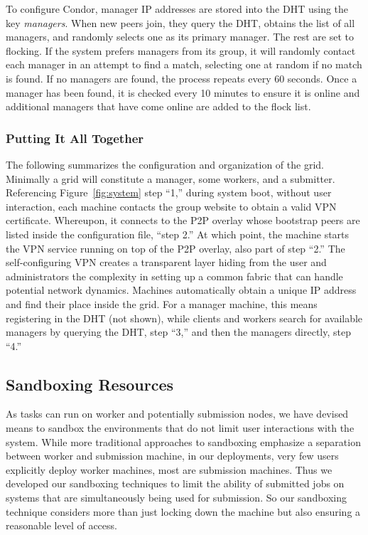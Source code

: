 \documentclass[conference]{IEEEtran}
\begin{document}
To configure Condor, manager IP addresses are stored into the DHT using the key
\emph{managers}.  When new peers join, they query the DHT, obtains the list of
all managers, and randomly selects one as its primary manager.  The rest are
set to flocking.  If the system prefers managers from its group, it will
randomly contact each manager in an attempt to find a match, selecting one at
random if no match is found.  If no managers are found, the process repeats
every 60 seconds.  Once a manager has been found, it is checked every 10
minutes to ensure it is online and additional managers that have come online
are added to the flock list.

\subsubsection{Putting It All Together}

The following summarizes the configuration and organization of the grid.
Minimally a grid will constitute a manager, some workers, and a submitter.
Referencing Figure~\ref{fig:system} step ``1,'' during system boot, without
user interaction, each machine contacts the group website to obtain a valid VPN
certificate.  Whereupon, it connects to the P2P overlay whose bootstrap peers
are listed inside the configuration file, ``step 2.''  At which point, the
machine starts the VPN service running on top of the P2P overlay, also part of
step ``2.'' The self-configuring VPN creates a transparent layer hiding from
the user and administrators the complexity in setting up a common fabric that
can handle potential network dynamics.  Machines automatically obtain a unique
IP address and find their place inside the grid.  For a manager machine, this
means registering in the DHT (not shown), while clients and workers search for
available managers by querying the DHT, step ``3,'' and then the managers
directly, step ``4.''  

\subsection{Sandboxing Resources}

As tasks can run on worker and potentially submission nodes, we have devised
means to sandbox the environments that do not limit user interactions with the
system.  While more traditional approaches to sandboxing emphasize a separation
between worker and submission machine, in our deployments, very few users
explicitly deploy worker machines, most are submission machines.  Thus we
developed our sandboxing techniques to limit the ability of submitted jobs on
systems that are simultaneously being used for submission.  So our sandboxing
technique considers more than just locking down the machine but also ensuring a
reasonable level of access.
\end{document}
